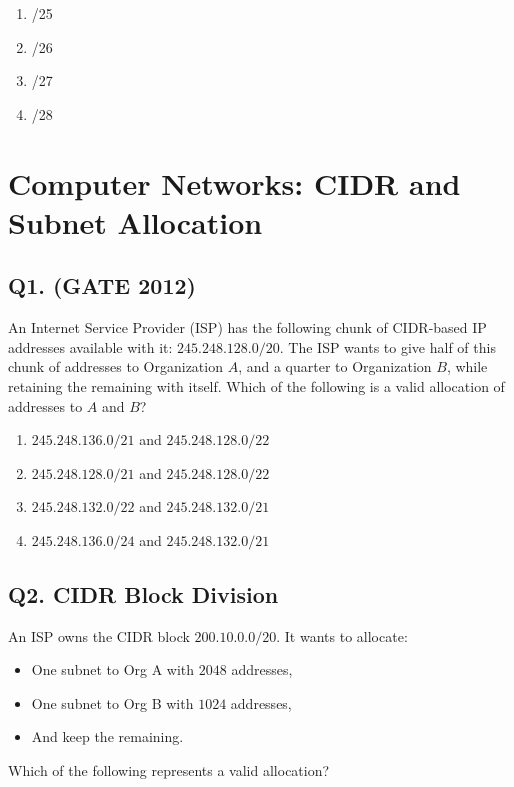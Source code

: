 \begin{enumerate}[label=(\alph*)]
    \item /25  
    \item /26  
    \item /27  
    \item /28  
\end{enumerate}

\section{Computer Networks: CIDR and Subnet Allocation}

\subsection*{Q1. (GATE 2012)}
An Internet Service Provider (ISP) has the following chunk of CIDR-based IP addresses available with it: $245.248.128.0/20$. The ISP wants to give half of this chunk of addresses to Organization $A$, and a quarter to Organization $B$, while retaining the remaining with itself. Which of the following is a valid allocation of addresses to $A$ and $B$?

\begin{enumerate}[label=(\alph*)]
    \item $245.248.136.0/21$ and $245.248.128.0/22$
    \item $245.248.128.0/21$ and $245.248.128.0/22$
    \item $245.248.132.0/22$ and $245.248.132.0/21$
    \item $245.248.136.0/24$ and $245.248.132.0/21$
\end{enumerate}

\vspace{1em}

\subsection*{Q2. CIDR Block Division}
An ISP owns the CIDR block $200.10.0.0/20$. It wants to allocate:
\begin{itemize}
    \item One subnet to Org A with $2048$ addresses,
    \item One subnet to Org B with $1024$ addresses,
    \item And keep the remaining.
\end{itemize}
Which of the following represents a valid allocation?


